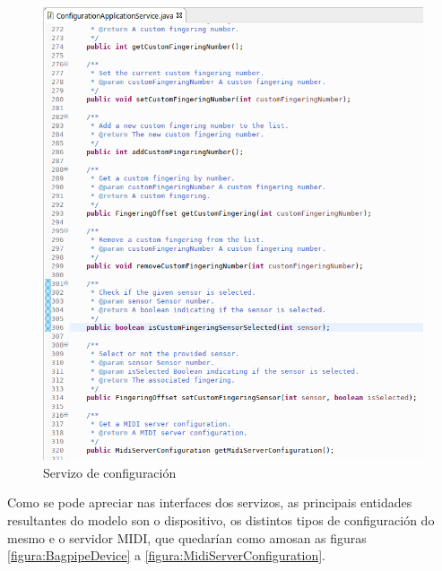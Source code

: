    \begin{figure}[htbp]
    \centering
    \includegraphics[scale=0.6, keepaspectratio=true]{./imagenes/servizo-configuracion-7.png}
    \caption{Servizo de configuración}
    \label{figura:ServizoConfiguracion7}
   \end{figure}
   
   Como se pode apreciar nas interfaces dos servizos, as principais entidades
   resultantes do modelo son o dispositivo, os distintos tipos de configuración
   do mesmo e o servidor MIDI, que quedarían como amosan as figuras 
   \ref{figura:BagpipeDevice} a \ref{figura:MidiServerConfiguration}. \\
   
